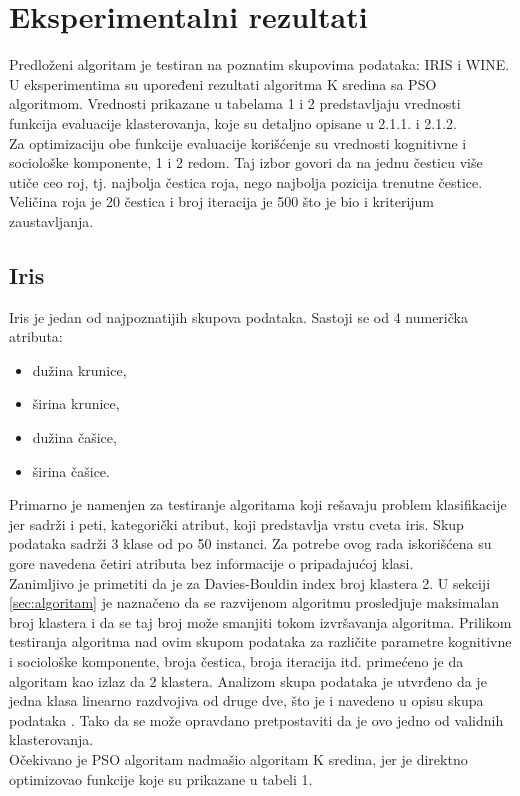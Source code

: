 \documentclass[a4paper,serbian]{symopissr}
\begin{document}
\section{Eksperimentalni rezultati}

\label{eksperimenti}
Predloženi algoritam je testiran na poznatim skupovima podataka: IRIS i WINE. U eksperimentima su upoređeni rezultati algoritma K sredina sa PSO algoritmom. Vrednosti prikazane u tabelama 1 i 2 predstavljaju vrednosti funkcija evaluacije klasterovanja, koje su detaljno opisane u 2.1.1. i 2.1.2.\\
Za optimizaciju obe funkcije evaluacije korišćenje su vrednosti kognitivne i sociološke komponente, 1 i 2 redom. Taj izbor govori da na jednu česticu više utiče ceo roj, tj. najbolja čestica roja, nego najbolja pozicija trenutne čestice. Veličina roja je 20 čestica i broj iteracija je 500 što je bio i kriterijum zaustavljanja.

\subsection{Iris}
Iris \cite{iris} je jedan od najpoznatijih skupova podataka. Sastoji se od 4 numerička atributa:
\begin{itemize}
	\item dužina krunice,
	\item širina krunice,
	\item dužina čašice,
	\item širina čašice.
\end{itemize} Primarno je namenjen za testiranje algoritama koji rešavaju problem klasifikacije jer sadrži i peti, kategorički atribut, koji predstavlja vrstu cveta iris. Skup podataka sadrži 3 klase od po 50 instanci. Za potrebe ovog rada iskorišćena su gore navedena četiri atributa bez informacije o pripadajućoj klasi.\\
Zanimljivo je primetiti da je za Davies-Bouldin index broj klastera 2.
U sekciji \ref{sec:algoritam} je naznačeno da se razvijenom algoritmu prosledjuje maksimalan broj klastera i da se taj broj može smanjiti tokom izvršavanja algoritma. Prilikom testiranja algoritma nad ovim skupom podataka za različite parametre kognitivne i sociološke komponente, broja čestica, broja iteracija itd. primećeno je da algoritam kao izlaz da 2 klastera. Analizom skupa podataka je utvrđeno da je jedna klasa linearno razdvojiva od druge dve, što je i navedeno u opisu skupa podataka \cite{uci_iris}.
Tako da se može opravdano pretpostaviti da je ovo jedno od validnih klasterovanja.\\
Očekivano je PSO algoritam nadmašio algoritam K sredina, jer je direktno optimizovao funkcije koje su prikazane u tabeli 1.\\
\end{document}
